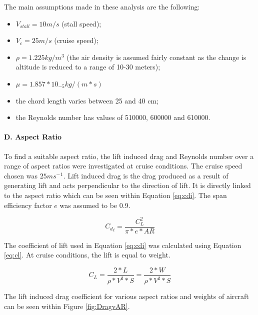 \documentclass[12pt]{article}
\begin{document}
\noindent The main assumptions made in these analysis are the following: \\

\begin{itemize}
    \item $V_{stall} = 10 m/s$ (stall speed);
    \item $V_c = 25 m/s$ (cruise speed);
    \item $\rho = 1.225 kg/m^3$ (the air density is assumed fairly constant as the change is altitude is reduced to a range of 10-30 meters);
    \item $\mu = 1.857*10_{-5}kg/(m*s)$ 
    \item the chord length varies between 25 and 40 cm;
    \item the Reynolds number has values of 510000, 600000 and 610000. 
\end{itemize}

\paragraph{D. Aspect Ratio} To find a suitable aspect ratio, the lift induced drag and Reynolds number over a range of aspect ratios were investigated at cruise conditions. The cruise speed chosen was $25ms{{^-}^1}$.  Lift induced drag is the drag produced as a result of generating lift and acts perpendicular to the direction of lift. It is directly linked to the aspect ratio which can be seen within Equation \ref{eq:cdi}. The span efficiency factor $e$ was assumed to be 0.9. 

\begin{equation} \label{eq:cdi}
    C{{_d}_i} = \frac{C_L^2}{\pi*e*AR}
\end{equation}

\noindent The coefficient of lift used in Equation \ref{eq:cdi}  was calculated using Equation \ref{eq:cl}. At cruise conditions, the lift is equal to weight. 

\begin{equation} \label{eq:cl}
    C{_L} = \frac{2*L}{\rho*{V^2}*S} = \frac{2*W}{\rho*{V^2}*S}
\end{equation}

\noindent The lift induced drag coefficient for various aspect ratios and weights of aircraft can be seen within Figure \ref{fig:DragvAR}. \\
\end{document}
